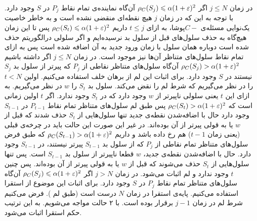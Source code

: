 در زمان $j \le N$  اگر
$\rho_C(S_j) \leqslant \alpha (1+\varepsilon)^2 $ 
آن‌گاه نماینده‌ی تمام نقاط $P_j$ در $S$ وجود دارد.
با توجه به این که در زمان $j$ هیچ نقطه‌ای منقضی نشده است و به خاطر خاصیت یک‌نوایی مسئله‌ی $C-$پوشا، به ازای $ t \le j$ داریم 
$\rho_C(S_t) \leqslant \alpha (1+\varepsilon)^2 $ 
پس تا این زمان هیچ‌گاه به حذف سلول‌های قبل از سلول بد نرسیده‌ایم و اگر سلولی درالگوریتم حذف شده است دوباره همان سلول با زمان ورود جدید به آن اضافه شده است پس به ازای تمام نقاط سلول‌های متناظر آن‌ها نیز موجود است.
در زمان $j \le N$ اگر داشته باشیم
$\rho_C(S_j) > \alpha (1+\varepsilon)^2 $
آن‌گاه سلول‌های متناظر نقاطی از $P_j$ که پیرتر از سلول بد $S_j$ نیستند در $S$ وجود دارد.
برای اثبات این لم از برهان خلف استفاده می‌کنیم. اولین $t < N$ را در نظر می‌گیریم که شرط لم را نقض می‌کند. سلول بد $S_t$ را $w$ در نظر می‌گیریم. به ازای این $t$ یعنی سلولی ناپیرتر از $w$ وجود دارد که در $S_t$ وجود ندارد. اگر $t$ اولین زمانی است که 
$\rho_C(S_t) > \alpha (1+\varepsilon)^2 $
پس طبق لم  سلول‌های متناظر تمام نقاط $P_{t-1}$ در $S_{t-1}$ وجود دارد حال با اضافه‌شدن نقطه‌ی جدید تنها سلول‌هایی از $S_t$ حذف شدند که قبل از $w$ یا به قولی پیرتر از آن بوده‌اند. در غیر این صورت این حالت باید در چرخه‌ی قبلی (یعنی زمان $t-1$) هم رخ داده باشد و داریم
$\rho_C(S_{t-1}) > \alpha (1+\varepsilon)^2 $
که طبق فرض سلول‌های متناظر تمام نقاطی از $P_j$ که از سلول‌ بد $S_{t-1}$ پیرتر نیستند، در $S_{t-1}$ وجود دارد. حال با اضافه‌شدن نقطه‌ی جدید، $w$ قطعا ناپیرتر از سلول بد $S_{t-1}$ است. پس تنها سلول‌هایی از $S_t$ حذف می‌شوند که قبل از $w$ یا به قولی پیرتر از آن بوده‌اند. پس چنین $t$ وجود ندارد و لم اثبات می‌شود.
در زمان $j > N$  اگر
$\rho_C(S_j) \leqslant \alpha (1+\varepsilon)^2 $ 
آن‌گاه سلول‌های متناظر تمام نقاط $P_j$ در $S$ وجود دارد.
برای اثبات این موضوع از استقرا استفاده می‌کنیم. پایه‌‌ی استقرا در زمان $N$ درست است (طبق لم ). فرض می‌کنیم شرط لم در زمان $j-1$ برقرار بوده است. با ۲ حالت مواجه می‌شویم.
به این ترتیب حکم استقرا اثبات می‌شود.

